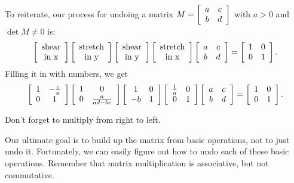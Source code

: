\documentclass[../gatm.tex]{subfiles}
\begin{document}
\noindent To reiterate, our process for undoing a matrix $M=\left[\begin{array}{cc} a & c \\ b & d \end{array}\right]$ with $a>0$ and $\det M\neq 0$ is:
$$\left[\begin{array}{c}\text{shear} \\ \text{in x}\end{array}\right]
\left[\begin{array}{c}\text{stretch} \\ \text{in y}\end{array}\right]
\left[\begin{array}{c}\text{shear} \\ \text{in y}\end{array}\right]
\left[\begin{array}{c}\text{stretch} \\ \text{in x}\end{array}\right]
\left[\begin{array}{cc} a & c \\ b & d \end{array}\right]=\left[\begin{array}{cc} 1 & 0 \\ 0 & 1 \end{array}\right].$$
Filling it in with numbers, we get
$$\left[\begin{array}{cc} 1 & -\frac{c}{a} \\ 0 & 1 \end{array}\right]\left[\begin{array}{cc} 1 & 0 \\ 0 & \frac{a}{ad-bc} \end{array}\right]\left[\begin{array}{cc} 1 & 0 \\ -b & 1 \end{array}\right]\left[\begin{array}{cc} \frac{1}{a} & 0 \\ 0 & 1 \end{array}\right]\left[\begin{array}{cc} a & c \\ b & d \end{array}\right]=\left[\begin{array}{cc} 1 & 0 \\ 0 & 1 \end{array}\right].$$ \label{prob:list_of_matrices}

\noindent Don't forget to multiply from right to left.

Our ultimate goal is to build up the matrix from basic operations, not to just undo it. Fortunately, we can easily figure out how to undo each of these basic operations. Remember that matrix multiplication is associative, but not commutative.
\end{document}
